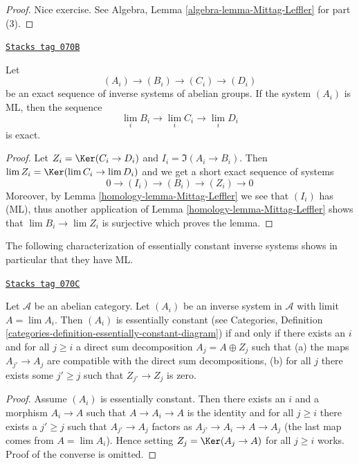 \begin{proof}
Nice exercise. See
Algebra, Lemma \ref{algebra-lemma-Mittag-Leffler} for part (3).
\end{proof}

\begin{lemma}
\label{homology-lemma-apply-Mittag-Leffler}
\href{https://stacks.math.columbia.edu/tag/070B}{\texttt{Stacks tag 070B}}

Let
$$
(A_i) \to (B_i) \to (C_i) \to (D_i)
$$
be an exact sequence of inverse systems of abelian groups. If the
system $(A_i)$ is ML, then the sequence
$$
\lim_i B_i \to \lim_i C_i \to \lim_i D_i
$$
is exact.
\end{lemma}

\begin{proof}

Let $Z_i = \Ker(C_i \to D_i)$ and $I_i = \Im(A_i \to B_i)$.
Then $\lim Z_i = \Ker(\lim C_i \to \lim D_i)$ and
we get a short exact sequence of systems
$$
0 \to (I_i) \to (B_i) \to (Z_i) \to 0
$$
Moreover, by
Lemma \ref{homology-lemma-Mittag-Leffler}
we see that $(I_i)$ has (ML), thus another application of
Lemma \ref{homology-lemma-Mittag-Leffler}
shows that $\lim B_i \to \lim Z_i$ is surjective which
proves the lemma.
\end{proof}

The following characterization of essentially constant inverse systems
shows in particular that they have ML.

\begin{lemma}
\label{homology-lemma-essentially-constant}
\href{https://stacks.math.columbia.edu/tag/070C}{\texttt{Stacks tag 070C}}

Let $\mathcal{A}$ be an abelian category.
Let $(A_i)$ be an inverse system in $\mathcal{A}$ with limit $A = \lim A_i$.
Then $(A_i)$ is essentially constant (see
Categories, Definition
\ref{categories-definition-essentially-constant-diagram})
if and only if there exists an $i$ and for all $j \geq i$ a direct sum
decomposition $A_j = A \oplus Z_j$ such that
(a) the maps $A_{j'} \to A_j$ are compatible with the direct sum
decompositions, (b) for all $j$ there exists some $j' \geq j$ such that
$Z_{j'} \to Z_j$ is zero.
\end{lemma}

\begin{proof}
Assume $(A_i)$ is essentially constant. Then there exists an $i$ and
a morphism $A_i \to A$ such that $A \to A_i \to A$ is the identity and
for all $j \geq i$ there exists
a $j' \geq j$ such that $A_{j'} \to A_j$ factors as
$A_{j'} \to A_i \to A \to A_j$ (the last map comes from $A = \lim A_i$).
Hence setting $Z_j = \Ker(A_j \to A)$ for all $j \geq i$ works.
Proof of the converse is omitted.
\end{proof}

